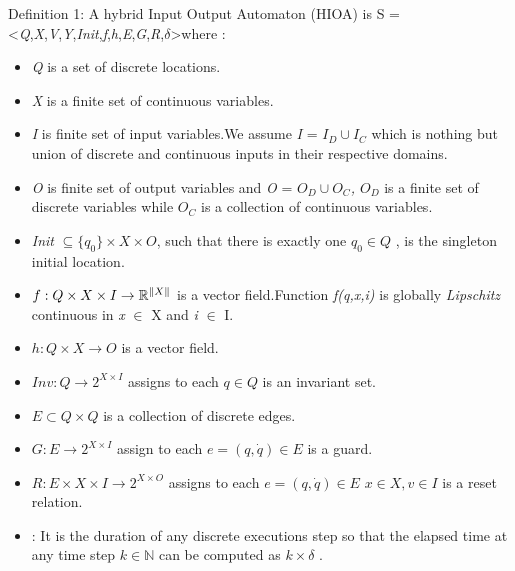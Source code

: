 {Definition 1: A hybrid Input Output Automaton (HIOA)\citep{Lygeros1999} is S = \textless\textit{Q},\textit{X},\textit{V},\textit{Y},\textit{Init},\textit{f},\textit{h},\textit{E},\textit{G},\textit{R},\textit{$\delta$}\textgreater where  :
\begin{itemize}
	\setlength{\itemsep}{-12pt}
	\setlength{\parskip}{0pt}
	\item\textit{Q} is a set of discrete locations. \newline
	\item\textit{X} is a finite set of continuous variables. \newline
	\item\textit{I} is finite set of input variables.We assume \textit{I} =  \textit{\(I_{D} \cup I_{C}\)} which is nothing but union of discrete and continuous inputs in their respective domains.\newline
	\item \textit{O} is finite set of output variables and  \textit{O} =  \textit{\(O_{D} \cup O_{C}\), \textit{\(O_{D}\)}} is a finite set of discrete variables while \textit{\(O_{C}\)} is a collection of continuous  variables. \newline
	\item \textit{Init} \(\subseteq \{q_{0}\} \times X \times O\), such that there is exactly one \(q_{0} \in Q\) , is the singleton initial location.\newline
	\item \(f  : Q \times X \times I \to  \mathbb{R}^\norm{X}\)   is a vector field.Function \textit{f(q,x,i)} is globally \textit{Lipschitz} continuous in \textit{x} $\in$ X  and \textit{i} $\in$ I.  \newline
	\item \(h : Q \times X \to O \) is a  vector field. \newline
	\item \(Inv :Q \to {2}^{X \times I}\) assigns to each \(q  \in Q\) is an invariant set. \newline
	\item \(E \subset Q \times Q\) is a collection of discrete edges.\newline
	\item \(G :E \to {2}^{X \times I}\) assign to each  \(e =(q, \dot{q}) \in E \) is a guard. \newline
	\item \(R :E \times X \times I \to {2}^{X \times O} \) assigns to each   \(e =(q, \dot{q}) \in E \) 
	\(x \in X , v \in I \) is a reset relation.\newline
	\item \textdelta  :  It is the duration of any discrete executions step so that the elapsed time at any time step \(k \in \mathbb{N}\) can be computed as 
	\( k \times \delta \) .
\end{itemize}


}
